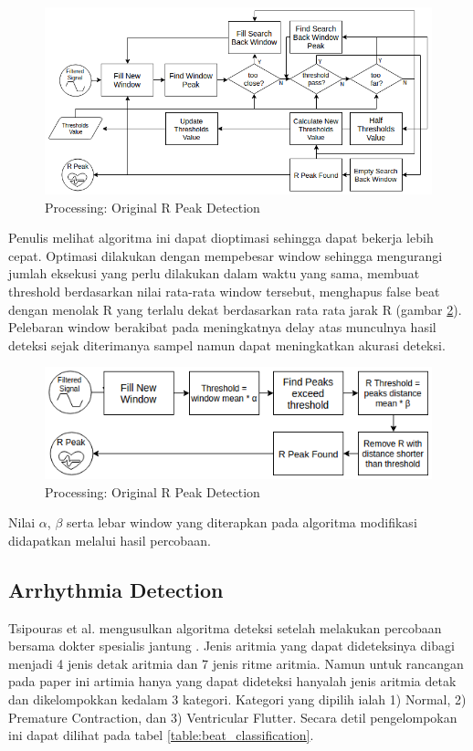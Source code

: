 \documentclass[conference]{IEEEtran}
\begin{document}
\begin{figure}[htbp]
\centerline{\includegraphics[scale=0.35]{images/processing_ori.png}}
\caption{Processing: Original R Peak Detection}
\label{fig:processing_ori}
\end{figure}

Penulis melihat algoritma ini dapat dioptimasi sehingga dapat bekerja lebih cepat. Optimasi dilakukan dengan mempebesar window sehingga mengurangi jumlah eksekusi yang perlu dilakukan dalam waktu yang sama, membuat threshold berdasarkan nilai rata-rata window tersebut, menghapus false beat dengan menolak R yang terlalu dekat berdasarkan rata rata jarak R (gambar \ref{fig:processing_modif}). Pelebaran window berakibat pada meningkatnya delay atas munculnya hasil deteksi sejak diterimanya sampel namun dapat meningkatkan akurasi deteksi.

\begin{figure}[htbp]
\centerline{\includegraphics[scale=0.45]{images/processing_modif.png}}
\caption{Processing: Original R Peak Detection}
\label{fig:processing_modif}
\end{figure}

Nilai $\alpha$, $\beta$ serta lebar window yang diterapkan pada algoritma modifikasi didapatkan melalui hasil percobaan.

\subsection{Arrhythmia Detection}
Tsipouras et al. mengusulkan algoritma deteksi setelah melakukan percobaan bersama dokter spesialis jantung \cite{tsipouras}. Jenis aritmia yang dapat dideteksinya dibagi menjadi 4 jenis detak aritmia dan 7 jenis ritme aritmia. Namun untuk rancangan pada paper ini artimia hanya yang dapat dideteksi hanyalah jenis aritmia detak dan dikelompokkan kedalam 3 kategori. Kategori yang dipilih ialah 1) Normal, 2) Premature Contraction, dan 3) Ventricular Flutter. Secara detil pengelompokan ini dapat dilihat pada tabel \ref{table:beat_classification}.
\end{document}
